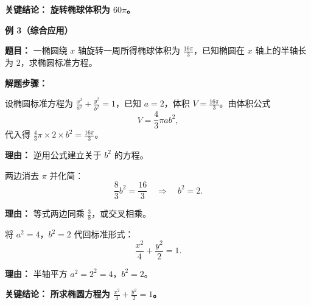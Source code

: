 \begin{examplebox}
\textbf{\textcolor{CExample}{关键结论：}} \textbf{旋转椭球体积为 \(60\pi\)。}

\medskip
\textbf{\textcolor{CExample}{例 3（综合应用）}}

\textbf{\textcolor{CExample}{题目：}} 一椭圆绕 \(x\) 轴旋转一周所得椭球体积为 \(\frac{16\pi}{3}\)，已知椭圆在 \(x\) 轴上的半轴长为 \(2\)，求椭圆标准方程。

\textbf{\textcolor{CExample}{解题步骤：}}
\begin{description}[style=nextline, leftmargin=2.8em, labelsep=0.5em, itemsep=0.45em]
    \item[\textbf{第一步（设未知数列方程）：}] 设椭圆标准方程为 \(\frac{x^{2}}{a^{2}}+\frac{y^{2}}{b^{2}}=1\)，已知 \(a=2\)，体积 \(V=\frac{16\pi}{3}\)。由体积公式 
    \[
    V=\frac{4}{3}\pi a b^{2},
    \]
    代入得 \(\frac{4}{3}\pi \times 2 \times b^{2} = \frac{16\pi}{3}\)。
    \par\textbf{理由：} 逆用公式建立关于 \(b^{2}\) 的方程。
    \item[\textbf{第二步（化简求解）：}] 两边消去 \(\pi\) 并化简：
    \[
    \frac{8}{3} b^{2} = \frac{16}{3} \quad\Longrightarrow\quad b^{2}=2.
    \]
    \par\textbf{理由：} 等式两边同乘 \(\frac{3}{8}\)，或交叉相乘。
    \item[\textbf{第三步（写出方程）：}] 将 \(a^{2}=4\)，\(b^{2}=2\) 代回标准形式：
    \[
    \frac{x^{2}}{4}+\frac{y^{2}}{2}=1.
    \]
    \par\textbf{理由：} 半轴平方 \(a^{2}=2^{2}=4\)，\(b^{2}=2\)。
\end{description}

\textbf{\textcolor{CExample}{关键结论：}} \textbf{所求椭圆方程为 \(\frac{x^{2}}{4}+\frac{y^{2}}{2}=1\)。}
\end{examplebox}
